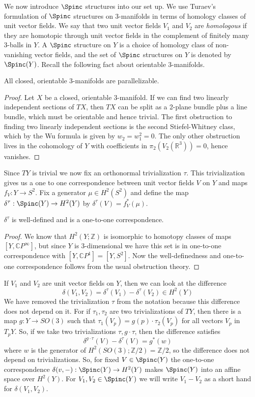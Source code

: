 We now introduce $\Spinc$ structures into our set up. We use Turaev's formulation of $\Spinc$ structures on 3-manifolds in terms of homology classes of unit vector fields. We say that two unit vector fields $V_1$ and $V_2$ are \emph{homologous} if they are homotopic through unit vector fields in the complement of finitely many 3-balls in $Y$. A $\Spinc$ structure on $Y$ is a choice of homology class of non-vanishing vector fields, and the set of $\Spinc$ structures on $Y$ is denoted by $\Spinc(Y)$. Recall the following fact about orientable 3-manifolds.
\begin{lem}
All closed, orientable 3-manifolds are parallelizable.
\end{lem}
\begin{proof}
Let $X$ be a closed, orientable 3-manifold. If we can find two linearly independent sections of $TX$, then $TX$ can be split as a 2-plane bundle plus a line bundle, which must be orientable and hence trivial. The first obstruction to finding two linearly independent sections is the second Stiefel-Whitney class, which by the Wu formula is given by $w_2=w_1^2=0$. The only other obstruction lives in the cohomology of $Y$ with coefficients in $\pi_2(V_2(\mathbb R^3))=0$, hence vanishes.
\end{proof}
Since $TY$ is trivial we now fix an orthonormal trivialization $\tau$. This trivialization gives us a one to one correspondence between unit vector fields $V$ on $Y$ and maps $f_V : Y \rightarrow S^2$. Fix a generator $\mu \in H^2(S^2)$ and define the map $\delta^\tau : \Spinc(Y) \rightarrow H^2(Y)$ by $\delta^\tau(V)=f_V^*(\mu)$.
\begin{lem}
$\delta^\tau$ is well-defined and is a one-to-one correspondence.
\end{lem}
\begin{proof}
We know that $H^2(Y;\mathbb Z)$ is isomorphic to homotopy classes of maps $[Y,\mathbb CP^\infty]$, but since $Y$ is 3-dimensional we have this set is in one-to-one correspondence with $[Y,\mathbb CP^1] = [Y,S^2]$. Now the well-definedness and one-to-one correspondence follows from the usual obstruction theory.
\end{proof}

If $V_1$ and $V_2$ are unit vector fields on $Y$, then we can look at the difference
\[ \delta(V_1,V_2) = \delta^\tau(V_1)-\delta^\tau(V_2) \in H^2(Y) \]
We have removed the trivialization $\tau$ from the notation because this difference does not depend on it. For if $\tau_1,\tau_2$ are two trivializations of $TY$, then there is a map $g : Y \rightarrow SO(3)$ such that $\tau_1(V_p) = g(p) \cdot \tau_2(V_p)$ for all vectors $V_p$ in $T_p Y$. So, if we take two trivializations $\tau,g \cdot \tau$, then the difference satisfies
\[ \delta^{g\cdot\tau}(V) - \delta^\tau(V) = g^*(w) \]
where $w$ is the generator of $H^2(SO(3);\mathbb Z/2) = \mathbb Z/2$, so the difference does not depend on trivializations. So, for fixed $V \in \Spinc(Y)$ the one-to-one correspondence $\delta(v,-) : \Spinc(Y) \rightarrow H^2(Y)$ makes $\Spinc(Y)$ into an affine space over $H^2(Y)$. For $V_1,V_2 \in \Spinc(Y)$ we will write $V_1-V_2$ as a short hand for $\delta(V_1,V_2)$. 

